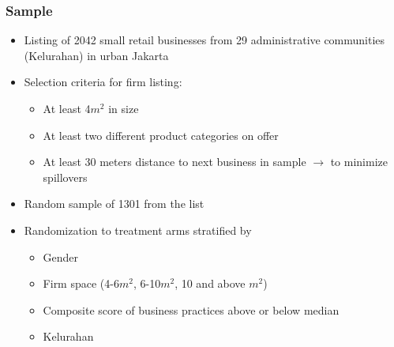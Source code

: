 \documentclass[10pt]{beamer}
\begin{document}
\begin{frame}
\frametitle{Sample}
\begin{itemize}
\item Listing of 2042 small retail businesses from 29 administrative communities (Kelurahan) in urban Jakarta
\item Selection criteria for firm listing:
	\begin{itemize}
	\item At least 4$m^{2}$ in size
	\item At least two different product categories on offer
	\item At least 30 meters distance to next business in sample $\rightarrow$ to minimize spillovers
	\end{itemize}
\item Random sample of 1301 from the list
\item Randomization to treatment arms stratified by
	\begin{itemize}
	\item Gender
	\item Firm space (4-6$m^2$, 6-10$m^2$, 10 and above $m^2$)
	\item Composite score of business practices above or below median
	\item Kelurahan
	\end{itemize}
\end{itemize}
\end{frame}
\end{document}
